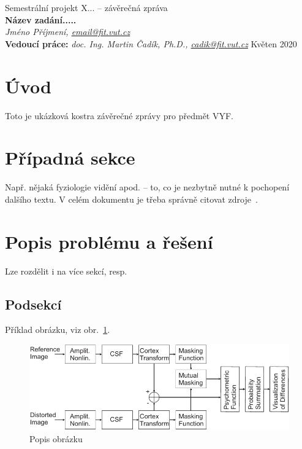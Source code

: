 \documentclass[11pt,a4paper,oneside]{article}
\begin{document}
\thispagestyle{empty}
\begin{center}
\vspace*{60mm}
{Semestrální projekt X... -- závěrečná zpráva }\\
\smallskip
{\Large\bf Název zadání.....}\\
\smallskip
{\it Jméno Příjmení, \url{email@fit.vut.cz}}\\
\vfill
{\bf Vedoucí práce:} {\it doc. Ing. Martin Čadík, Ph.D., \url{cadik@fit.vut.cz}} 
\hfill {Květen 2020}



\end{center}
\newpage


\section{Úvod}
Toto je ukázková kostra závěrečné zprávy pro předmět VYF.



\section{Případná sekce}
Např. nějaká fyziologie vidění apod. -- to, co je nezbytně nutné k pochopení
dalšího textu. V celém dokumentu je třeba správně citovat 
zdroje~\cite{Daly:1993:VDP:197765.197783}.


\section{Popis problému a řešení}
Lze rozdělit i na více sekcí, resp. 

\subsection{Podsekcí}
Příklad obrázku, viz obr.~\ref{fig:vdp}.


\begin{figure}[htb]
  \begin{center}
    \includegraphics{fig/vdp}
    \caption{Popis obrázku} 
    \label{fig:vdp}
  \end{center}
\end{figure}
\end{document}
